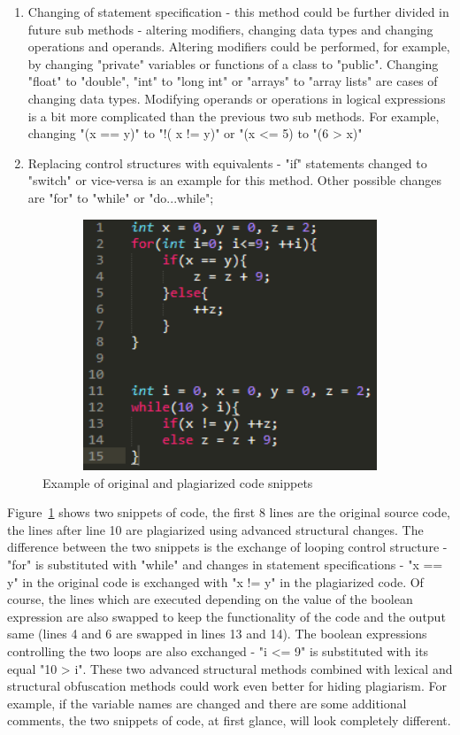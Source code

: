 \documentclass[12pt]{article}
\begin{document}
\begin{enumerate}

	\item Changing of statement specification - this method could be further divided in future sub methods - altering modifiers, changing data types and changing operations and operands. Altering modifiers could be performed, for example, by changing "private" variables or functions of a class to "public". Changing "float" to "double", "int" to "long int" or "arrays" to "array lists" are cases of changing data types. Modifying operands or operations in logical expressions is a bit more complicated than the previous two sub methods. For example, changing "(x == y)" to "!( x != y)" or "(x <= 5) to "(6 > x)"
	
	\item Replacing control structures with equivalents - "if" statements changed to "switch" or vice-versa is an example for this method. Other possible changes are "for" to "while" or "do...while";
	
\end{enumerate}

\begin{figure} [ht]
    \centering
    \includegraphics[width=12cm, height=7.5cm]{../images/sourceCodeAdvanced.png}
    \caption{Example of original and plagiarized code snippets}
    \label{fig:sourceCodeAdvanced}
\end{figure}

Figure~\ref{fig:sourceCodeAdvanced} shows two snippets of code, the first 8 lines are the original source code, the lines after line 10 are plagiarized using advanced structural changes. The difference between the two snippets is the exchange of looping control structure - "for" is substituted with "while" and changes in statement specifications - "x == y" in the original code is exchanged with "x != y" in the plagiarized code. Of course, the lines which are executed depending on the value of the boolean expression are also swapped to keep the functionality of the code and the output same (lines 4 and 6 are swapped in lines 13 and 14). The boolean expressions controlling the two loops are also exchanged - "i <= 9" is substituted with its equal "10 > i". These two advanced structural methods combined with lexical and structural obfuscation methods could work even better for hiding plagiarism. For example, if the variable names are changed and there are some additional comments, the two snippets of code, at first glance, will look completely different. 
\end{document}
